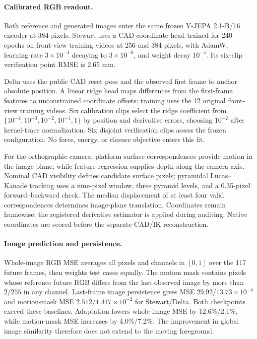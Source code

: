 \documentclass[10pt,twocolumn,letterpaper]{article}
\begin{document}
\paragraph{Calibrated RGB readout.}
Both reference and generated images enter the same frozen V-JEPA 2.1-B/16 encoder at 384 pixels. Stewart uses a CAD-coordinate head trained for 240 epochs on front-view training videos at 256 and 384 pixels, with AdamW, learning rate $3\times10^{-4}$ decaying to $3\times10^{-6}$, and weight decay $10^{-4}$. Its six-clip verification point RMSE is 2.65 mm.

Delta uses the public CAD reset pose and the observed first frame to anchor absolute position. A linear ridge head maps differences from the first-frame features to unconstrained coordinate offsets; training uses the 12 original front-view training videos. Six calibration clips select the ridge coefficient from $\{10^{-4},10^{-3},10^{-2},10^{-1},1\}$ by position and derivative errors, choosing $10^{-2}$ after kernel-trace normalization. Six disjoint verification clips assess the frozen configuration. No force, energy, or closure objective enters this fit.

For the orthographic camera, platform surface correspondences provide motion in the image plane, while feature regression supplies depth along the camera axis. Nominal CAD visibility defines candidate surface pixels; pyramidal Lucas--Kanade tracking uses a nine-pixel window, three pyramid levels, and a 0.35-pixel forward--backward check. The median displacement of at least four valid correspondences determines image-plane translation. Coordinates remain framewise; the registered derivative estimator is applied during auditing. Native coordinates are scored before the separate CAD/IK reconstruction.

\paragraph{Image prediction and persistence.}
Whole-image RGB MSE averages all pixels and channels in $[0,1]$ over the 117 future frames, then weights test cases equally. The motion mask contains pixels whose reference future RGB differs from the last observed image by more than $2/255$ in any channel. Last-frame image persistence gives MSE $29.92/13.73\times10^{-4}$ and motion-mask MSE $2.512/1.447\times10^{-2}$ for Stewart/Delta. Both checkpoints exceed these baselines. Adaptation lowers whole-image MSE by 12.6\%/2.1\%, while motion-mask MSE increases by 4.0\%/7.2\%. The improvement in global image similarity therefore does not extend to the moving foreground.
\end{document}
